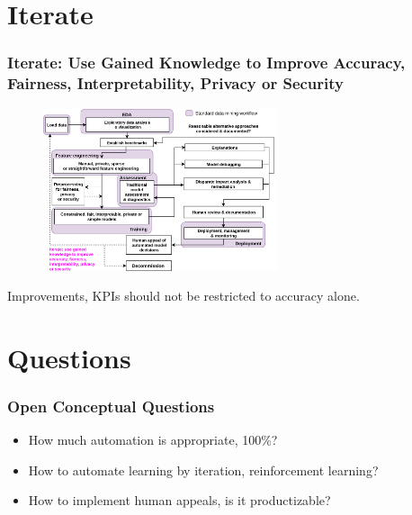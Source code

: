 \documentclass[11pt,
               aspectratio=169,
               hyperref={colorlinks}
               ]{beamer}
\begin{document}
	\section{Iterate}

		\begin{frame}	

			\frametitle{Iterate: Use Gained Knowledge to Improve Accuracy, Fairness, Interpretability, Privacy or Security}		
			
			\begin{figure}[htb]
				\begin{center}
					\includegraphics[height=135pt]{img/iter.png}
					\label{fig:blueprint}
				\end{center}
			\end{figure}	

			\centering
			
			Improvements, KPIs should not be restricted to accuracy alone.
		
		\end{frame}

	\section{Questions}

		\begin{frame}

			\frametitle{Open Conceptual Questions}		

			\begin{itemize}
				\item How much automation is appropriate, 100\%?
				\item How to automate learning by iteration, reinforcement learning?
				\item How to implement human appeals, is it productizable?
			\end{itemize}
			
		\end{frame}
\end{document}
